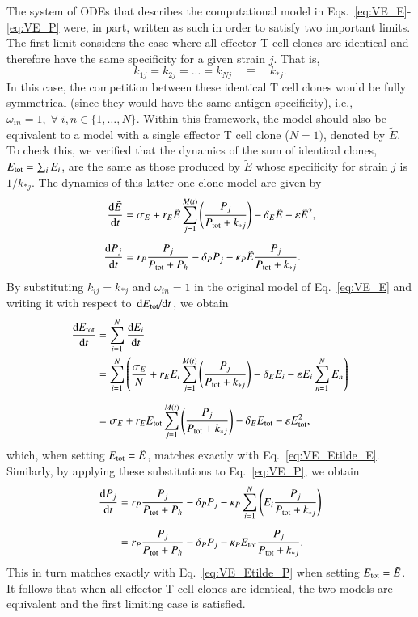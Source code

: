 The system of ODEs that describes the computational model in Eqs.~\eqref{eq:VE_E}-\eqref{eq:VE_P} were, in part, written as such in order to satisfy two important limits. The first limit considers the case where all effector T cell clones are identical and therefore have the same specificity for a given strain $j$. That is,
%
\begin{equation*}
   k_{1j} = k_{2j} = ... =  k_{Nj} \quad \equiv \quad k_{*j}.
\end{equation*}
%
In this case, the competition between these identical T cell clones would be fully symmetrical (since they would have the same antigen specificity), i.e., $\omega_{in} = 1, \; \forall \; i, n\in\{1,\dots,N\}$. Within this framework, the model should also be equivalent to a model with a single effector T cell clone ($N=1)$, denoted by $\tilde{E}$. To check this, we verified that the dynamics of the sum of identical clones, $E_{\textup{tot}} = \sum_i E_i$, are the same as those produced by $\tilde{E}$ whose specificity for strain $j$ is $1/k_{*j}$. The dynamics of this latter one-clone model are given by
%
\begin{align}
    \dv{\tilde{E}}{t} &= \sigma_E + r_E \tilde{E} \sum_{j=1}^{M(t)}\left(\frac{P_j}{P_\textup{tot} + k_{*j}} \right) -\delta_E \tilde{E} - \varepsilon \tilde{E}^2, \label{eq:VE_Etilde_E} \\[0.5em]
    \dv{P_j}{t} &= r_P \frac{P_j}{P_{\textup{tot}}+P_h} - \delta_P P_j - \kappa_P \tilde{E} \frac{P_j}{P_{\textup{tot}} + k_{*j}}. \label{eq:VE_Etilde_P}
\end{align}
%
By substituting $k_{ij} = k_{*j}$ and $\omega_{in} = 1$ in the original model of Eq.~\eqref{eq:VE_E} and writing it with respect to $\dv*{E_{\textup{tot}}}{t}$, we obtain
%
\begin{align*}
    \dv{E_{\textup{tot}}}{t} &= \sum_{i=1}^N \dv{E_i}{t} \\
    &= \sum_{i=1}^N \left( \frac{\sigma_E}{N} + r_E E_i \sum_{j=1}^{M(t)}\left(\frac{P_j}{P_\textup{tot} + k_{*j}} \right) -\delta_E E_i - \varepsilon E_i \sum_{n=1}^N E_n \right) \\[0.5em]
    &= \sigma_E + r_E E_{\textup{tot}} \sum_{j=1}^{M(t)}\left(\frac{P_j}{P_\textup{tot} + k_{*j}} \right) -\delta_E E_{\textup{tot}} - \varepsilon E_{\textup{tot}}^2,
\end{align*}
%
which, when setting $E_{\textup{tot}} = \tilde{E}$, matches exactly with Eq.~\eqref{eq:VE_Etilde_E}. Similarly, by applying these substitutions to Eq.~\eqref{eq:VE_P}, we obtain
%
\begin{align*}
    \dv{P_j}{t} &=r_P \frac{P_j}{P_{\textup{tot}}+P_h} - \delta_P P_j - \kappa_P \sum_{i=1}^{N}\left(E_i \frac{P_j}{P_{\textup{tot}} + k_{*j}} \right) \\[0.5em]
    &= r_P \frac{P_j}{P_{\textup{tot}}+P_h} - \delta_P P_j - \kappa_P E_{\textup{tot}} \frac{P_j}{P_{\textup{tot}} + k_{*j}}.
\end{align*}
%
This in turn matches exactly with Eq.~\eqref{eq:VE_Etilde_P} when setting $E_{\textup{tot}} = \tilde{E}$. It follows that when all effector T cell clones are identical, the two models are equivalent and the first limiting case is satisfied.


